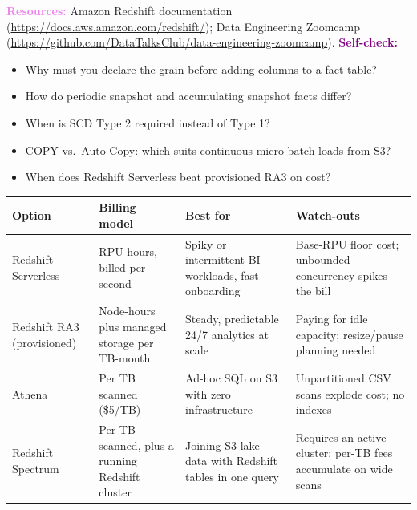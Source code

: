 \documentclass[11pt, a4paper]{article}
\newcommand{\resources}[1]{\vspace{1mm}\noindent\textbf{\textcolor{violet}{Resources:}} #1}
\newcommand{\selfcheck}[1]{\vspace{1mm}\noindent\textbf{\textcolor{purple}{Self-check:}} #1}
\begin{document}
\resources{Amazon Redshift documentation (\url{https://docs.aws.amazon.com/redshift/}); Data Engineering Zoomcamp (\url{https://github.com/DataTalksClub/data-engineering-zoomcamp}).}
\selfcheck{\begin{itemize}[label=-, leftmargin=1.5em, itemsep=0pt]
    \item Why must you declare the grain before adding columns to a fact table?
    \item How do periodic snapshot and accumulating snapshot facts differ?
    \item When is SCD Type 2 required instead of Type 1?
    \item COPY vs.\ Auto-Copy: which suits continuous micro-batch loads from S3?
    \item When does Redshift Serverless beat provisioned RA3 on cost?
\end{itemize}}

\begin{center}
\renewcommand{\arraystretch}{1.3}
\begin{tabular}{@{} l l p{4.0cm} p{4.6cm} @{}}
\toprule
\textbf{Option} & \textbf{Billing model} & \textbf{Best for} & \textbf{Watch-outs} \\
\midrule
Redshift Serverless & RPU-hours, billed per second & Spiky or intermittent BI workloads, fast onboarding & Base-RPU floor cost; unbounded concurrency spikes the bill \\
Redshift RA3 (provisioned) & Node-hours plus managed storage per TB-month & Steady, predictable 24/7 analytics at scale & Paying for idle capacity; resize/pause planning needed \\
Athena & Per TB scanned (\$5/TB) & Ad-hoc SQL on S3 with zero infrastructure & Unpartitioned CSV scans explode cost; no indexes \\
Redshift Spectrum & Per TB scanned, plus a running Redshift cluster & Joining S3 lake data with Redshift tables in one query & Requires an active cluster; per-TB fees accumulate on wide scans \\
\bottomrule
\end{tabular}
\end{center}
\end{document}

